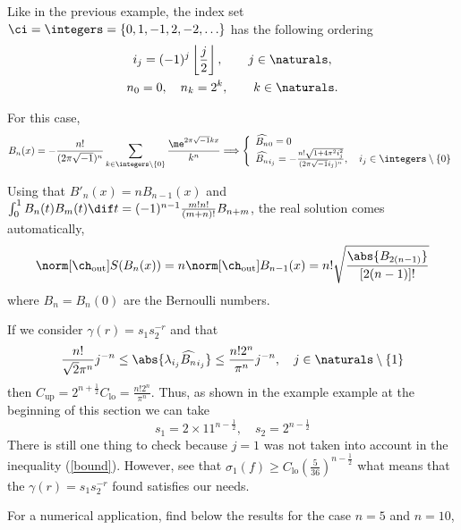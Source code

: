 \documentclass[final]{elsarticle}
\newcommand{\chout}{\ch_{\text{\rm{out}}}}
\theoremstyle{definition}
\theoremstyle{remark}
\DeclareMathOperator{\up}{up}
\DeclareMathOperator{\lo}{lo}
\begin{document}
Like in the previous example, the index set $\ci=\integers=\{0,1,-1,2,-2,\ldots\}$ has the following ordering
\begin{gather*}
i_j=(-1)^{j}\left\lfloor\frac{j}{2}\right\rfloor,\qquad j\in\naturals,\\
n_0=0,\quad n_k=2^k, \qquad k\in\naturals.
\end{gather*}

For this case,
\begin{equation*}
B_n(x)=-\frac{n!}{(2\pi\sqrt{-1})^n}\sum_{k\in\integers\setminus\{0\}}\frac{\me^{2\pi\sqrt{-1}kx}}{k^n}\Longrightarrow
\left\{\begin{array}{l}
\widehat{B_n}_0=0 \\
\widehat{B_n}_{i_j}=-\frac{n!\sqrt{1+4 \pi^2 i_j^2}}{(2\pi\sqrt{-1}i_j)^n},\quad i_j\in\integers\setminus\{0\}
\end{array}\right.
\end{equation*}

Using that $B'_n(x)=nB_{n-1}(x)$ and $\int_0^1B_n(t)B_m(t)\dif t=(-1)^{n-1}\frac{m!n!}{(m+n)!}B_{n+m}$, the real solution comes automatically,
\begin{equation*}
\norm[\chout]{S(B_n(x))}=n\norm[\chout]{B_{n-1}(x)}=n!\sqrt{\frac{\abs{B_{2(n-1)}}}{[2(n-1)]!}}
\end{equation*}
where $B_n=B_n(0)$ are the Bernoulli numbers.

If we consider $\gamma(r)=s_1s_2^{-r}$ and that
\begin{equation}\label{bound}
\frac{n!}{\sqrt{2}\pi^n}j^{-n} \le \abs{\lambda_{i_j}\widehat{B_n}_{i_j}} \le \frac{n!2^n}{\pi^n}j^{-n},\quad j\in\naturals\setminus\{1\}
\end{equation}
then $C_{\up}=2^{n+\frac{1}{2}}C_{\lo}=\frac{n!2^n}{\pi^n}$. Thus, as shown in the example example at the beginning of this section we can take
\begin{equation*}
s_1=2\times11^{n-\frac{1}{2}},\quad s_2=2^{n-\frac{1}{2}}
\end{equation*}
There is still one thing to check because $j=1$ was not taken into account in the inequality (\ref{bound}). However, see that $\sigma_1(f) \ge C_{\lo}\left(\frac{5}{36}\right)^{n-\frac{1}{2}}$ what means that the $\gamma(r)=s_1s_2^{-r}$ found satisfies our needs.

For a numerical application, find below the results for the case $n=5$ and $n=10$,
\end{document}
